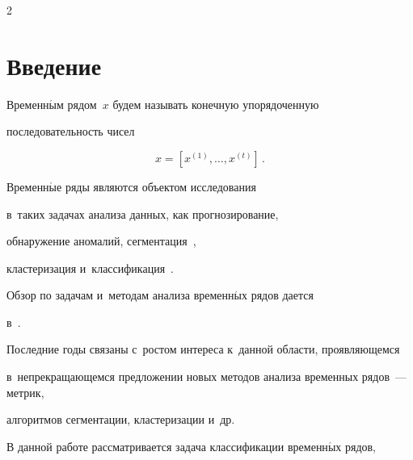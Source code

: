 












\thispagestyle{headings}





\begin{multicols}{2}





\label{st\stat}





\section{Введение}







Временн$\acute{\mbox{ы}}$м рядом~$x$ будем называть конечную упорядоченную 


последовательность чисел


$$


x = \left[x^{(1)}, \dots, x^{(t)}\right]\,.


$$


Временн$\acute{\mbox{ы}}$е ряды являются объектом исследования 


в~таких задачах анализа данных, как прогнозирование,


  обнаружение аномалий, сегментация~\cite{geurts2005segment},


  клас\-те\-ри\-за\-ция и~классификация~\cite{geurts2005segment}.


Обзор по задачам и~методам анализа временн$\acute{\mbox{ы}}$х рядов дается 


в~\cite{Esling:2012:TDM:2379776.2379788}.


Последние годы связаны с~ростом интереса к~данной области, проявляющемся 


в~непрекращающемся предложении новых методов анализа временных рядов~--- метрик, 


алгоритмов сегментации, кластеризации и~др.





В данной работе рассматривается задача классификации временн$\acute{\mbox{ы}}$х рядов, 



\end{multicols}
